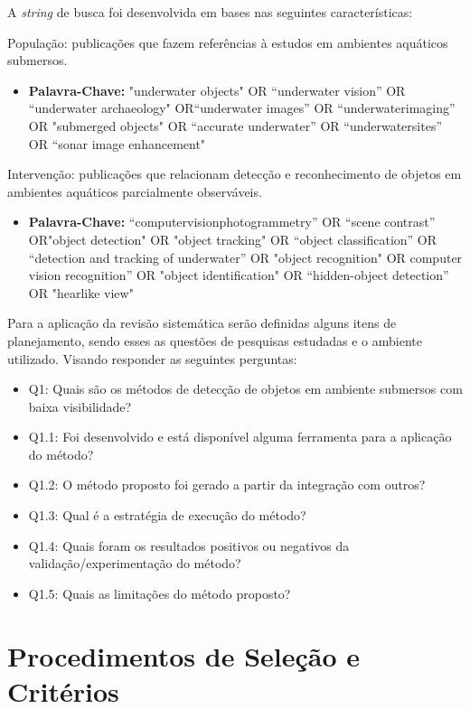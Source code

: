 A \textit{string} de busca foi desenvolvida em bases nas seguintes características:

População: publicações que fazem referências à estudos em ambientes aquáticos submersos.
\begin{itemize}
\item \textbf{Palavra-Chave:}
"underwater objects" OR “underwater vision” OR “underwater archaeology" OR“underwater images” OR “underwaterimaging” OR "submerged objects" OR “accurate underwater” OR “underwatersites” OR “sonar image enhancement"
\end{itemize}

Intervenção: publicações que relacionam detecção e reconhecimento de objetos em ambientes aquáticos parcialmente observáveis.
\begin{itemize}
\item \textbf{Palavra-Chave:}
“computervisionphotogrammetry” OR “scene contrast” OR"object detection" OR  "object tracking"  OR “object classification” OR “detection and tracking of underwater” OR "object recognition" OR computer vision recognition” OR "object identification" OR  “hidden-object detection” OR "hearlike view"
\end{itemize}

Para a aplicação da revisão sistemática serão definidas alguns itens de planejamento, sendo esses as questões de pesquisas estudadas e o ambiente utilizado. Visando responder as seguintes perguntas:
\begin{itemize}
  \item Q1: Quais são os métodos de detecção de objetos em ambiente submersos com baixa visibilidade? 
  \item Q1.1: Foi desenvolvido e está disponível alguma ferramenta para a aplicação do método?
  \item Q1.2: O método proposto foi gerado a partir da integração com outros?
  \item Q1.3: Qual é a estratégia de execução do método?
  \item Q1.4: Quais foram os resultados positivos ou negativos da validação/experimentação do método?
  \item Q1.5: Quais as limitações do método proposto?
\end{itemize}

\section{Procedimentos de Seleção e Critérios}

